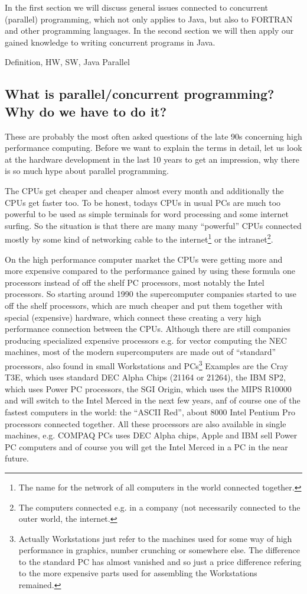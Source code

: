 In the first section we will discuss general issues connected to
concurrent (parallel) programming, which not only applies to Java, but
also to FORTRAN and other programming languages. In the second section
we will then apply our gained knowledge to writing concurrent programs
in Java.

Definition, HW, SW, Java Parallel


\subsection{What is parallel/concurrent programming?  \\
            Why do we have to do it?}

These are probably the most often asked questions of the late 90s
concerning high performance computing. 
Before we want to explain the terms in detail, let us look
at the hardware development in the last 10 years to get an impression,
why there is so much hype about parallel programming. 

The CPUs get cheaper and cheaper almost every month and additionally
the CPUs get faster too. To be honest, todays CPUs in usual PCs
are much too powerful to be used as simple terminals for word 
processing and some internet surfing. So the situation is that
there are many many ``powerful'' CPUs connected mostly by some kind
of networking cable to the internet\footnote{The name for the network of
all computers in the world connected together.} 
or the intranet\footnote{The computers connected e.g. in a company 
(not necessarily connected to the outer world, the internet.}.

On the high performance computer market the CPUs were getting more and more 
expensive compared to the performance gained by using these formula one
processors instead of off the shelf PC processors, most notably the
Intel processors. So starting around 1990 the supercomputer companies
started to use off the shelf processors, which are much cheaper and
put them together with special (expensive) hardware, which connect
these creating a very high performance connection between
the CPUs. Although there are still companies producing specialized expensive
processors e.g. for vector computing the NEC machines, most of
the modern supercomputers are made out of ``standard'' processors,
also found in small Workstations and PCs\footnote{Actually Workstations 
just refer to the machines used for some way of high performance
in graphics, number crunching or somewhere else. The difference to
the standard PC has almost vanished and so just a price
difference refering to the more  expensive parts used for 
assembling the Workstations remained.} 
Examples are the Cray T3E, which uses standard DEC Alpha Chips 
(21164 or 21264), the IBM SP2, which uses Power PC processors, the 
SGI Origin, which uses the MIPS R10000 and will switch to the 
Intel Merced in  the next few years, anf of course one of the fastest
computers in the world: the ``ASCII Red'', about 8000 Intel Pentium Pro
processors connected together.
All these processors are
also available in single machines, e.g. COMPAQ PCs uses DEC Alpha
chips, Apple and IBM sell Power PC computers and of course you
will get the Intel Merced in a PC in the near future. 

